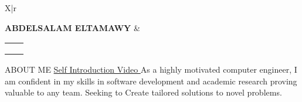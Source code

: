 \documentclass{resume}
\makeatletter
\newcommand{\email}{abdelsalam@solom.dev}
\makeatother
\begin{document}
\begin{tabularx}{\textwidth}{X|r}
	
	{\LARGE\MakeUppercase{\bf Abdelsalam ElTamawy}}
	&
	\small{
		\begin{tabular}{ll}
			\href{mailto:\email}{\iconanot{\faEnvelope}{\email}} & \href{https://solom.dev}{\iconanot{\faGlobe}{solom.dev}} \\
			\href{https://github.com/solomspd}{\iconanot{\faGithub}{github.com/solomspd}} & \href{tel:+201003435365}{\iconanot{\faPhone}{(+20)1003435365}} \\
			\href{https://linkedin.com/in/abdelsalam-et}{\iconanot{\faLinkedin}{/in/abdelsalam-et}} & \iconanot{\faMapMarker}{Nasr City, Cairo, Egypt} \\
		\end{tabular}
	}

\end{tabularx}

\begin{rsection}{\MakeUppercase{about me} \hfill \href{https://www.youtube.com/watch?v=8wwv_bj3Hvc}{Self Introduction Video \iconin{\faYoutubePlay}}}{}{}
	As a highly motivated computer engineer, I am confident in my skills in software development and academic research proving valuable to any team.
	Seeking to Create tailored solutions to novel problems.
\end{rsection}
\end{document}

